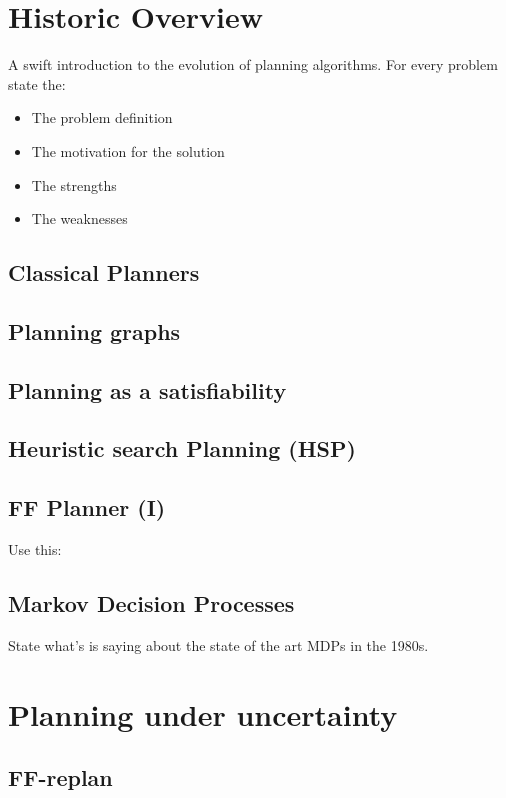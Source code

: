 \documentclass[runningheads,a4paper]{llncs}
\begin{document}
\section{Historic Overview}
A swift introduction to the evolution of planning algorithms. For every problem state the:
\begin{itemize}
	\item The problem definition
	\item The motivation for the solution
	\item The strengths
	\item The weaknesses
\end{itemize}

\subsection{Classical Planners}

\subsection{Planning graphs}

\subsection{Planning as a satisfiability}

\subsection{Heuristic search Planning (HSP)}

\subsection{FF Planner (I)}
Use this: \cite{Hoffmann01theff}

\subsection{Markov Decision Processes}

State what's \cite{monahan1982state} is saying about the state of the art MDPs
in the 1980s.

\section{Planning under uncertainty}

\subsection{FF-replan \cite{FFReplan}}
\end{document}

